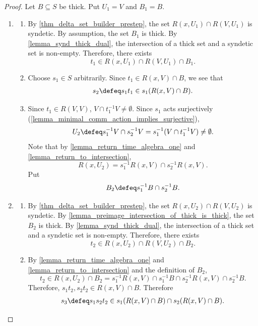\begin{proof}
    Let $B \subseteq S$ be thick. Put $U_1 = V$ and $B_1 = B$.

    \begin{enumerate}
        \item[Step 1]
        \begin{enumerate}
            \item By \cref{thm_delta_set_builder_prestep}, the set $R(x,U_1) \cap R(V,U_1)$ is syndetic.  By assumption, the set $B_1$ is thick. By \cref{lemma_synd_thick_dual}, the intersection of a thick set and a syndetic set is non-empty.  Therefore, there exists
            \[t_1 \in R(x,U_1) \cap R(V,U_1) \cap B_1.\]
            
            \item Choose $s_1 \in S$ arbitrarily. Since $t_1 \in R(x,V) \cap B$, we see that
            \begin{align}
                \label{eqn_delta_it_one}
                s_2 \defeq s_1t_1 \in s_1 (R(x,V) \cap B).
            \end{align}

            \item Since $t_1 \in R(V,V)$, $V \cap t_1^{-1} V \neq \emptyset$.  Since $s_1$ acts surjectively (\cref{lemma_minimal_comm_action_implies_surjective}),
            \[U_2 \defeq s_1^{-1} V \cap s_2^{-1} V = s_1^{-1} (V \cap t_1^{-1} V) \neq \emptyset.\]
            Note that by \cref{lemma_return_time_algebra_one} and \cref{lemma_return_to_intersection},
            \[R(x,U_2) = s_1^{-1} R(x,V) \cap s_2^{-1} R(x,V).\]
            Put
            \[B_2 \defeq s_1^{-1} B \cap s_2^{-1} B.\]
        \end{enumerate}

        \item[Step 2]
        \begin{enumerate}
            \item By \cref{thm_delta_set_builder_prestep}, the set $R(x,U_2) \cap R(V,U_2)$ is syndetic.  By \cref{lemma_preimage_intersection_of_thick_is_thick}, the set $B_2$ is thick. By \cref{lemma_synd_thick_dual}, the intersection of a thick set and a syndetic set is non-empty.  Therefore, there exists
            \[t_2 \in R(x,U_2) \cap R(V,U_2) \cap B_2.\]

            \item By \cref{lemma_return_time_algebra_one} and \cref{lemma_return_to_intersection} and the definition of $B_2$,
            \[t_2 \in R(x,U_2) \cap B_2 = s_1^{-1} R(x,V) \cap s_1^{-1} B \cap s_2^{-1} R(x,V) \cap s_2^{-1} B.\]
            Therefore, $s_1 t_2, s_2 t_2 \in R(x,V) \cap B$.  Therefore
            \begin{align}
                \label{eqn_delta_it_two}
                s_3 \defeq s_1s_2t_2 \in s_1 (R(x,V) \cap B) \cap s_2 (R(x,V) \cap B).
            \end{align}


\end{enumerate}
\end{enumerate}
\end{proof}
